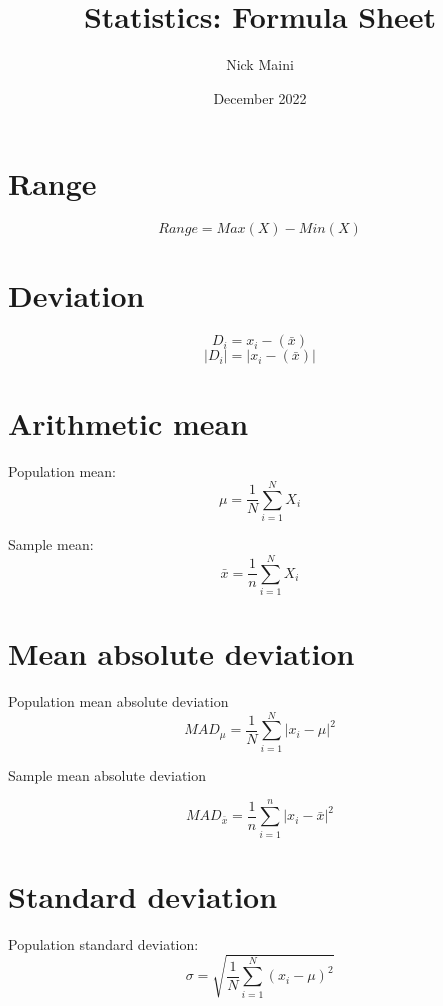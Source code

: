\documentclass{article}
\title{Statistics: Formula Sheet}
\author{Nick Maini}
\date{December 2022}
\begin{document}
\maketitle

\section*{Range}
\[
Range = Max(X) - Min(X)
\]
\hspace{0.5cm}

\section*{Deviation}

\[
D_i = x_i- (\bar{x})
\]
\[
|D_i| = |x_i- (\bar{x})|
\]

\hspace{0.5cm}

\section*{Arithmetic mean}
\hspace{0.5cm}


Population mean:
\[
\mu = \frac{1}{N}\sum_{i=1}^{N} X_{i} 
\] 

Sample mean:
\[
\bar{x}=\frac{1}{n}\sum_{i=1}^{N} X_{i} 
\]

\newpage

\section*{Mean absolute deviation}
\hspace{0.5cm}



Population mean absolute deviation
\[
MAD_\mu = \frac{1}{N} \sum_{i=1}^N |x_i - \mu|^2
\]

Sample mean absolute deviation

\[
MAD_{\bar{x}} = \frac{1}{n} \sum_{i=1}^n |x_i - \bar{x}|^2
\]

\hspace{0.5cm}



\section*{Standard deviation}
\hspace{0.5cm}

Population standard deviation:
\[
\sigma = \sqrt{\frac{1}{N} \sum_{i=1}^N (x_i - \mu)^2}
\]
\end{document}
